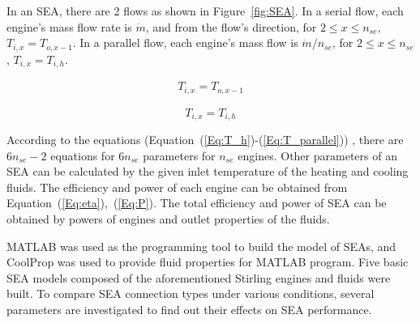 In an SEA, there are 2 flows as shown in Figure~\ref{fig:SEA}. In a serial flow, each engine's mass flow rate is $\dot{m}$, and from the flow's direction, for $2\leqslant{}x\leqslant{}n_{se}$, $T_{i,x} = T_{o,x-1}$. In a parallel flow, each engine's mass flow is $\dot{m}/n_{se}$, for $2\leqslant{}x\leqslant{}n_{se}$, $T_{i,x} = T_{i,h}$.

\begin{equation}
	\begin{split}
		T_{i,x} = T_{o,x-1}
		\label{Eq:T_serial}
	\end{split}
\end{equation}

\begin{equation}
	T_{i,x} = T_{i,h}
	\label{Eq:T_parallel}
\end{equation}

According to the equations 
(Equation~(\ref{Eq:T_h})-(\ref{Eq:T_parallel}))
, there are $6n_{se} - 2$ equations for $6n_{se}$ parameters for $n_{se}$ engines. Other parameters of an SEA can be calculated by the given inlet temperature of the heating and cooling fluids. The efficiency and power of each engine can be obtained from Equation~(\ref{Eq:eta}),~(\ref{Eq:P}). The total efficiency and power of SEA can be obtained by powers of engines and outlet properties of the fluids.

MATLAB was used as the programming tool to build the model of SEAs, and CoolProp was used to provide fluid properties for MATLAB program. Five basic SEA models composed of the aforementioned Stirling engines and fluids were built. To compare SEA connection types under various conditions, several parameters are investigated to find out their effects on SEA performance.

